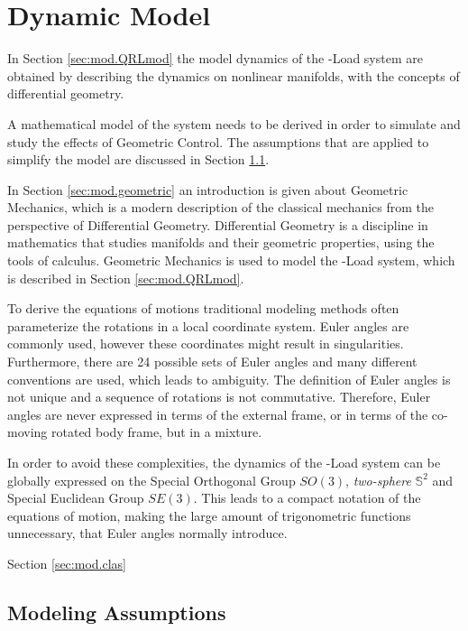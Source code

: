 \chapter{Dynamic Model} \label{ch:model}

In Section \ref{sec:mod.QRLmod} the model dynamics of the -Load system are obtained by describing the dynamics on nonlinear manifolds, with the concepts of differential geometry. 


A mathematical model of the system needs to be derived in order to simulate and study the effects of Geometric Control. 
The assumptions that are applied to simplify the model are discussed in Section \ref{sec:mod.assum}.

In Section \ref{sec:mod.geometric} an introduction is given about Geometric Mechanics, which is a modern description of the classical mechanics from the perspective of Differential Geometry. Differential Geometry is a discipline in mathematics that studies manifolds and their geometric properties, using the tools of calculus. Geometric Mechanics is used to model the -Load system, which is described in Section \ref{sec:mod.QRLmod}.

To derive the equations of motions traditional modeling methods often parameterize the rotations in a local coordinate system. Euler angles are commonly used, however these coordinates might result in singularities. Furthermore, there are 24 possible sets of Euler angles and many different conventions are used, which leads to ambiguity. The definition of Euler angles is not unique and a sequence of rotations is not commutative. Therefore, Euler angles are never expressed in terms of the external frame, or in terms of the co-moving rotated body frame, but in a mixture.

In order to avoid these complexities, the dynamics of the -Load system can be globally expressed on the Special Orthogonal Group $SO(3)$, \textit{two-sphere} $ \mathbb{S}^2 $ and Special Euclidean Group $ SE(3) $. This leads to a compact notation of the equations of motion, making the large amount of trigonometric functions unnecessary, that Euler angles normally introduce. 

Section \ref{sec:mod.clas}

\section{Modeling Assumptions}\label{sec:mod.assum} 


